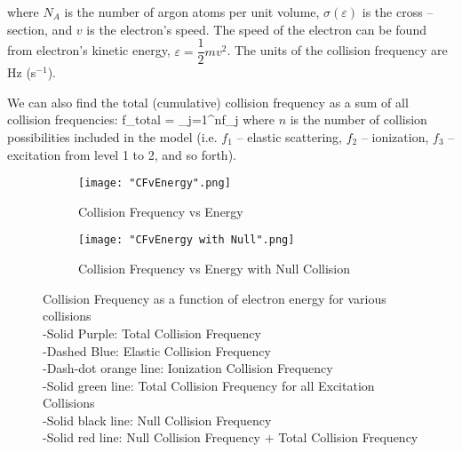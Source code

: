 \documentclass[12pt]{article}
\begin{document}
where $N_A$ is the number of argon atoms per unit volume, $\sigma (\varepsilon)$ is the cross – section, and $v$ is the electron's speed. The speed of the electron can be found from electron's kinetic energy, $\varepsilon = \dfrac{1}{2} m v^2$. The units of the collision frequency are Hz (s$^{-1}$). \vspace*{1ex}

We can also find the total (cumulative) collision frequency as a sum of all collision frequencies:
\beqn
f_{total} = \sum_{j=1}^{n}{f_j}
\label{cumulative collision_frequency}
\eeqn
where $n$ is the number of collision possibilities included in the model (i.e. $f_1$ – elastic scattering, $f_2$ – ionization, $f_3$ – excitation from level 1 to 2, and so forth).

\begin{figure}[h]
	\centering
	\begin{subfigure}{0.49\textwidth}
		\centering
		\texttt{[image: "CFvEnergy".png]}
		\caption{Collision Frequency vs Energy}
		\label{fig:left}
	\end{subfigure}
	\begin{subfigure}{0.49\textwidth}
	\centering
	\texttt{[image: "CFvEnergy with Null".png]}
	\caption{Collision Frequency vs Energy with Null Collision}
	\label{fig:left}
\end{subfigure}
	\label{CFs}
	\caption{Collision Frequency as a function of electron energy for various collisions\\
	-Solid Purple: Total Collision Frequency\\
	-Dashed Blue: Elastic Collision Frequency\\
	-Dash-dot orange line: Ionization Collision Frequency \\
	-Solid green line: Total Collision Frequency for all Excitation Collisions\\
	-Solid black line: Null Collision Frequency\\
	-Solid red line: Null Collision Frequency + Total Collision Frequency
	}
\end{figure}
\end{document}
